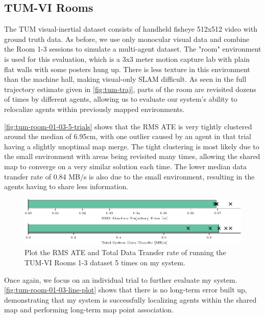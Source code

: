 \subsection{TUM-VI Rooms}
\label{sec:tum-rooms}
The TUM visual-inertial dataset \autocite{8593419} consists of handheld fisheye 512x512 video with ground truth data. As before, we use only monocular visual data and combine the Room 1-3 sessions to simulate a multi-agent dataset. The "room" environment is used for this evaluation, which is a 3x3 meter motion capture lab with plain flat walls with some posters hung up. There is less texture in this environment than the machine hall, making visual-only SLAM difficult. As seen in the full trajectory estimate given in \autoref{fig:tum-traj}, parts of the room are revisited dozens of times by different agents, allowing us to evaluate our system's ability to relocalize agents within previously mapped environments.

\autoref{fig:tum-room-01-03-5-trials} shows that the RMS ATE is very tightly clustered around the median of 6.95cm, with one outlier caused by an agent in that trial having a slightly unoptimal map merge. The tight clustering is most likely due to the small environment with areas being revisited many times, allowing the shared map to converge on a very similar solution each time. The lower median data transfer rate of 0.84 MB/s is also due to the small environment, resulting in the agents having to share less information.

\begin{figure}[h]
    \centering
    \includegraphics[width=0.8\linewidth]{figures/comparison_apr11_tum_room_trajectory_a.pdf}

    \caption{Plot the RMS ATE and Total Data Transfer rate of running the TUM-VI Rooms 1-3 dataset 5 times on my system.}
    \label{fig:tum-room-01-03-5-trials}
\end{figure}

Once again, we focus on an individual trial to further evaluate my system. \autoref{fig:tum-room-01-03-line-plot} shows that there is no long-term error built up, demonstrating that my system is successfully localizing agents within the shared map and performing long-term map point association.

